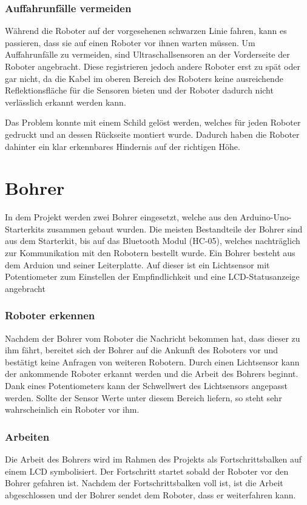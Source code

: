 \subsubsection{Auffahrunfälle vermeiden}
Während die Roboter auf der vorgesehenen schwarzen Linie fahren, kann es passieren, dass sie auf einen Roboter vor ihnen warten müssen. Um Auffahrunfälle zu vermeiden, sind Ultraschallsensoren an der Vorderseite der Roboter angebracht. Diese registrieren jedoch andere Roboter erst zu spät oder gar nicht, da die Kabel im oberen Bereich des Roboters keine ausreichende Reflektionsfläche für die Sensoren bieten und der Roboter dadurch nicht verlässlich erkannt werden kann.

Das Problem konnte mit einem Schild gelöst werden, welches für jeden Roboter gedruckt und an dessen Rückseite montiert wurde. Dadurch haben die Roboter dahinter ein klar erkennbares Hindernis auf der richtigen Höhe.

\section{Bohrer}
In dem Projekt werden zwei Bohrer eingesetzt, welche aus den Arduino-Uno-Starterkits zusammen gebaut wurden. Die meisten Bestandteile der Bohrer sind aus dem Starterkit, bis auf das Bluetooth Modul (HC-05), welches nachträglich zur Kommunikation mit den Robotern bestellt wurde. Ein Bohrer besteht aus dem Arduion und seiner Leiterplatte. Auf dieser ist ein Lichtsensor mit Potentiometer zum Einstellen der Empfindlichkeit und eine LCD-Statusanzeige angebracht

\subsubsection{Roboter erkennen}
Nachdem der Bohrer vom Roboter die Nachricht bekommen hat, dass dieser zu ihm fährt, bereitet sich der Bohrer auf die Ankunft des Roboters vor und bestätigt keine Anfragen von weiteren Robotern. Durch einen Lichtsensor kann der ankommende Roboter erkannt werden und die Arbeit des Bohrers beginnt. Dank eines Potentiometers kann der Schwellwert des Lichtsensors angepasst werden. Sollte der Sensor Werte unter diesem Bereich liefern, so steht sehr wahrscheinlich ein Roboter vor ihm.

\subsubsection{Arbeiten}
Die Arbeit des Bohrers wird im Rahmen des Projekts als Fortschrittsbalken auf einem LCD symbolisiert. Der Fortschritt startet sobald der Roboter vor den Bohrer gefahren ist. Nachdem der Fortschrittsbalken voll ist, ist die Arbeit abgeschlossen und der Bohrer sendet dem Roboter, dass er weiterfahren kann.

